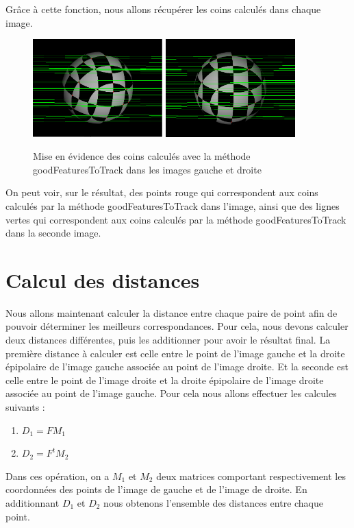 \documentclass[a4paper,10pt]{article}
\begin{document}
Grâce à cette fonction, nous allons récupérer les coins calculés dans chaque image.
\begin{figure}[!h]
  \center
    \includegraphics[width=5cm]{leftR.png}
    \includegraphics[width=5cm]{rightR.png}
  \caption{Mise en évidence des coins calculés avec la méthode goodFeaturesToTrack dans les images gauche et droite}
\end{figure}
On peut voir, sur le résultat, des points rouge qui correspondent aux coins calculés par la méthode goodFeaturesToTrack
dans l'image, ainsi que des lignes vertes qui correspondent aux coins calculés par la méthode goodFeaturesToTrack dans la
seconde image.
 
\section{Calcul des distances}
Nous allons maintenant calculer la distance entre chaque paire de point afin de pouvoir déterminer
les meilleurs correspondances. Pour cela, nous devons calculer deux distances différentes, puis les 
additionner pour avoir le résultat final. La première distance à calculer est celle entre le point de l'image gauche et la droite épipolaire 
de l'image gauche associée au point de l'image droite. Et la seconde est celle entre le point de l'image droite et la droite épipolaire de 
l'image droite associée au point de l'image gauche. Pour cela nous allons effectuer les calcules suivants :
\begin{enumerate}
 \item $D_1 = FM_1$
 \item $D_2 = F^tM_2$
\end{enumerate}
Dans ces opération, on a $M_1$ et $M_2$ deux matrices comportant respectivement les coordonnées des points 
de l'image de gauche et de l'image de droite. En additionnant $D_1$ et $D_2$ nous obtenons l'ensemble des
distances entre chaque point.
\end{document}
